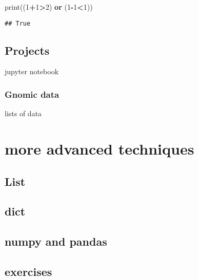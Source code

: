 \documentclass[
]{book}
\newenvironment{Shaded}{\begin{snugshade}}{\end{snugshade}}
\newcommand{\BuiltInTok}[1]{#1}
\newcommand{\DecValTok}[1]{\textcolor[rgb]{0.00,0.00,0.81}{#1}}
\newcommand{\KeywordTok}[1]{\textcolor[rgb]{0.13,0.29,0.53}{\textbf{#1}}}
\newcommand{\NormalTok}[1]{#1}
\newcommand{\OperatorTok}[1]{\textcolor[rgb]{0.81,0.36,0.00}{\textbf{#1}}}
\begin{document}
\begin{Shaded}
\begin{Highlighting}[]
\BuiltInTok{print}\NormalTok{((}\DecValTok{1}\OperatorTok{+}\DecValTok{1}\OperatorTok{\textgreater{}}\DecValTok{2}\NormalTok{) }\KeywordTok{or}\NormalTok{ (}\DecValTok{1}\OperatorTok{{-}}\DecValTok{1}\OperatorTok{\textless{}}\DecValTok{1}\NormalTok{))}
\end{Highlighting}
\end{Shaded}

\begin{verbatim}
## True
\end{verbatim}

\hypertarget{projects}{%
\section{Projects}\label{projects}}

jupyter notebook

\hypertarget{gnomic-data}{%
\subsection{Gnomic data}\label{gnomic-data}}

lists of data

\hypertarget{more-advanced-techniques}{%
\chapter{more advanced techniques}\label{more-advanced-techniques}}

\hypertarget{list}{%
\section{List}\label{list}}

\hypertarget{dict}{%
\section{dict}\label{dict}}

\hypertarget{numpy-and-pandas}{%
\section{numpy and pandas}\label{numpy-and-pandas}}

\hypertarget{exercises-1}{%
\section{exercises}\label{exercises-1}}
\end{document}
